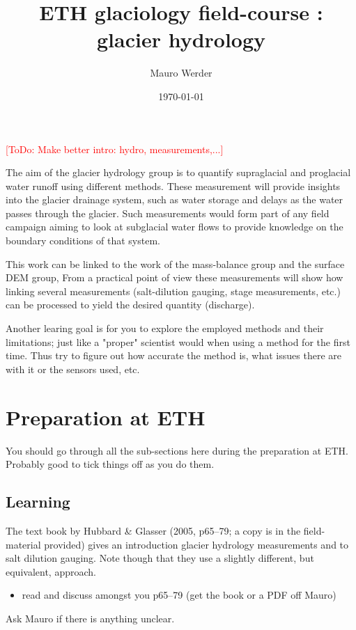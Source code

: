 \documentclass[DIV=15,halfparskip,11pt,headinclude]{scrartcl}
\author{Mauro Werder}
\date{\today}
\title{ETH glaciology field-course \the\year{}:\\ glacier hydrology}
\newcommand{\todo}[1]{\textcolor{red}{[ToDo: #1]}}
\newcommand{\todo}[1]{}
\begin{document}
  \maketitle
  \todo{Make better intro: hydro, measurements,...}

The aim of the glacier hydrology group is to quantify supraglacial and
proglacial water runoff using different methods.  %
These measurement will provide insights into the glacier drainage
system, such as water storage and delays as the water passes through
the glacier.  Such measurements would form part of any field campaign
aiming to look at subglacial water flows to provide knowledge on the
boundary conditions of that system.

This work can be linked to the work of the mass-balance group and the
surface DEM group,
%
From a practical point of view these measurements will show how
linking several measurements (salt-dilution gauging, stage
measurements, etc.) can be processed to yield the desired quantity
(discharge).

Another learing goal is for you to explore the employed methods and their limitations;
just like a "proper" scientist would when using a method for the first time.  Thus
try to figure out how accurate the method is, what issues there are with it or the sensors used, etc.

\section{Preparation at ETH}

%

You should go through all the sub-sections here during the preparation
at ETH.  Probably good to tick things off as you do them.

\subsection{Learning}

The text book by Hubbard \& Glasser (2005, p65--79; a copy is in the
field-material provided) gives an introduction glacier hydrology
measurements and to salt dilution gauging.
Note though that they use a slightly different, but equivalent,
approach.
\begin{itemize}
\item read and discuss amongst you p65--79 (get the book or a PDF off Mauro)
\end{itemize}
Ask Mauro if there is anything unclear.
\end{document}
